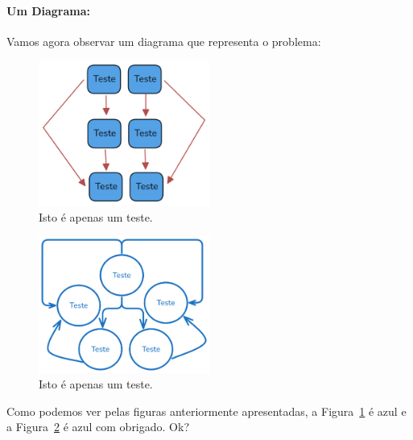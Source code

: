\paragraph{Um Diagrama:} Vamos agora observar um diagrama que representa o problema:

\begin{figure}[htb!]
    \centering
    \includegraphics[width=0.5\textwidth]{figures/teste}
    \caption{Isto é apenas um teste.}
    \label{fig:teste}
\end{figure}

\begin{figure}[htb!]
    \centering
    \includegraphics[width=0.5\textwidth]{figures/diagrama}
    \caption{Isto é apenas um teste.}
    \label{fig:diagrama}
\end{figure}

Como podemos ver pelas figuras anteriormente apresentadas, a Figura~\ref{fig:teste} é azul e a Figura~\ref{fig:diagrama} é azul com obrigado.
Ok?